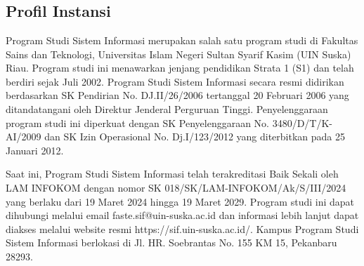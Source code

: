 %
%
%
%

\chapter{\babDua}


\section{Profil Instansi}
\thispagestyle{fancy} %
Program Studi Sistem Informasi merupakan salah satu program studi di Fakultas Sains dan Teknologi, Universitas Islam Negeri Sultan Syarif Kasim (UIN Suska) Riau. Program studi ini menawarkan jenjang pendidikan Strata 1 (S1) dan telah berdiri sejak Juli 2002. Program Studi Sistem Informasi secara resmi didirikan berdasarkan SK Pendirian No. DJ.II/26/2006 tertanggal 20 Februari 2006 yang ditandatangani oleh Direktur Jenderal Perguruan Tinggi. Penyelenggaraan program studi ini diperkuat dengan SK Penyelenggaraan No. 3480/D/T/K-AI/2009 dan SK Izin Operasional No. Dj.I/123/2012 yang diterbitkan pada 25 Januari 2012.

Saat ini, Program Studi Sistem Informasi telah terakreditasi Baik Sekali oleh LAM INFOKOM dengan nomor SK 018/SK/LAM-INFOKOM/Ak/S/III/2024 yang berlaku dari 19 Maret 2024 hingga 19 Maret 2029. Program studi ini dapat dihubungi melalui email faste.sif@uin-suska.ac.id dan informasi lebih lanjut dapat diakses melalui website resmi https://sif.uin-suska.ac.id/. Kampus Program Studi Sistem Informasi berlokasi di Jl. HR. Soebrantas No. 155 KM 15, Pekanbaru 28293.
